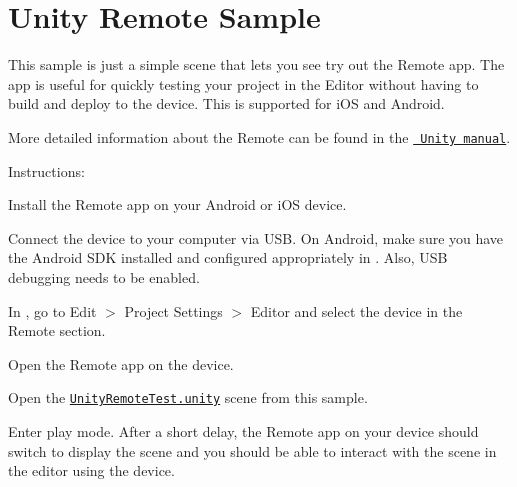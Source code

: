 \chapter{Unity Remote Sample}
\hypertarget{md__hey_tea_9_2_library_2_package_cache_2com_8unity_8inputsystem_0d1_86_83_2_samples_0i_2_unity_remote_2_r_e_a_d_m_e}{}\label{md__hey_tea_9_2_library_2_package_cache_2com_8unity_8inputsystem_0d1_86_83_2_samples_0i_2_unity_remote_2_r_e_a_d_m_e}
\label{md__hey_tea_9_2_library_2_package_cache_2com_8unity_8inputsystem_0d1_86_83_2_samples_0i_2_unity_remote_2_r_e_a_d_m_e_autotoc_md1626}%
%
 This sample is just a simple scene that lets you see try out the  Remote app. The app is useful for quickly testing your project in the  Editor without having to build and deploy to the device. This is supported for i\+OS and Android.

More detailed information about the  Remote can be found in the \href{https://docs.unity3d.com/Manual/UnityRemote5.html}{\texttt{ Unity manual}}.

Instructions\+:


\begin{DoxyEnumerate}
\item Install the  Remote app on your Android or i\+OS device.
\item Connect the device to your computer via USB. On Android, make sure you have the Android SDK installed and configured appropriately in . Also, USB debugging needs to be enabled.
\item In , go to {\ttfamily Edit \texorpdfstring{$>$}{>} Project Settings \texorpdfstring{$>$}{>} Editor} and select the device in the {\ttfamily {} Remote} section. 
\item Open the  Remote app on the device.
\item Open the \href{UnityRemoteTest.unity}{\texttt{ {\ttfamily Unity\+Remote\+Test.\+unity}}} scene from this sample.
\item Enter play mode. After a short delay, the  Remote app on your device should switch to display the scene and you should be able to interact with the scene in the editor using the device. 
\end{DoxyEnumerate}
